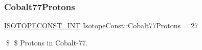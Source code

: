\subsubsection{\texorpdfstring{Cobalt77\+Protons}{Cobalt77Protons}}
{\footnotesize\ttfamily \mbox{\hyperlink{group___isotope_const-_macros_ga5f18360b3e99483a35c32d789e62621c}{I\+S\+O\+T\+O\+P\+E\+C\+O\+N\+S\+T\+\_\+\+I\+NT}} Isotope\+Const\+::\+Cobalt77\+Protons = 27}

\$ \$ Protons in Cobalt-\/77. 